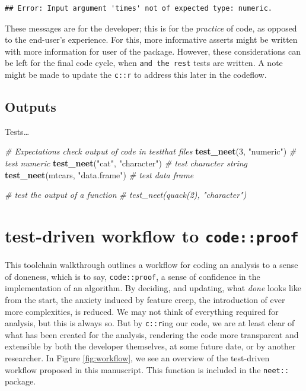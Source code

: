 \documentclass[
]{article}
\newenvironment{Shaded}{\begin{snugshade}}{\end{snugshade}}
\newcommand{\CommentTok}[1]{\textcolor[rgb]{0.56,0.35,0.01}{\textit{#1}}}
\newcommand{\DecValTok}[1]{\textcolor[rgb]{0.00,0.00,0.81}{#1}}
\newcommand{\KeywordTok}[1]{\textcolor[rgb]{0.13,0.29,0.53}{\textbf{#1}}}
\newcommand{\NormalTok}[1]{#1}
\newcommand{\StringTok}[1]{\textcolor[rgb]{0.31,0.60,0.02}{#1}}
\begin{document}
\begin{verbatim}
## Error: Input argument 'times' not of expected type: numeric.
\end{verbatim}

These messages are for the developer; this is for the \emph{practice} of code, as opposed to the end-user's experience. For this, more informative asserts might be written with more information for user of the package. However, these considerations can be left for the final code cycle, when \texttt{and\ the\ rest} tests are written. A note might be made to update the \texttt{c::r} to address this later in the codeflow.

\hypertarget{outputs}{%
\subsection{Outputs}\label{outputs}}

Tests\ldots{}

\begin{Shaded}
\begin{Highlighting}[]
\CommentTok{\# Expectations check output of code in testthat files}
\KeywordTok{test\_neet}\NormalTok{(}\DecValTok{3}\NormalTok{, }\StringTok{"numeric"}\NormalTok{) }\CommentTok{\# test numeric}
\KeywordTok{test\_neet}\NormalTok{(}\StringTok{"cat"}\NormalTok{, }\StringTok{"character"}\NormalTok{) }\CommentTok{\# test character string}
\KeywordTok{test\_neet}\NormalTok{(mtcars, }\StringTok{"data.frame"}\NormalTok{) }\CommentTok{\# test data frame}

\CommentTok{\# test the output of a function}
\CommentTok{\# test\_neet(quack(2), "character")}
\end{Highlighting}
\end{Shaded}

\hypertarget{test-driven-workflow-to-codeproof}{%
\section{\texorpdfstring{test-driven workflow to \texttt{code::proof}}{test-driven workflow to code::proof}}\label{test-driven-workflow-to-codeproof}}

This toolchain walkthrough outlines a workflow for coding an analysis to a sense of doneness, which is to say, \texttt{code::proof}, a sense of confidence in the implementation of an algorithm. By deciding, and updating, what \emph{done} looks like from the start, the anxiety induced by feature creep, the introduction of ever more complexities, is reduced. We may not think of everything required for analysis, but this is always so. But by \texttt{c::r}ing our code, we are at least clear of what has been created for the analysis, rendering the code more transparent and extensible by both the developer themselves, at some future date, or by another researcher. In Figure \ref{fig:workflow}, we see an overview of the test-driven workflow proposed in this manuscript. This function is included in the \texttt{neet::} package.
\end{document}
